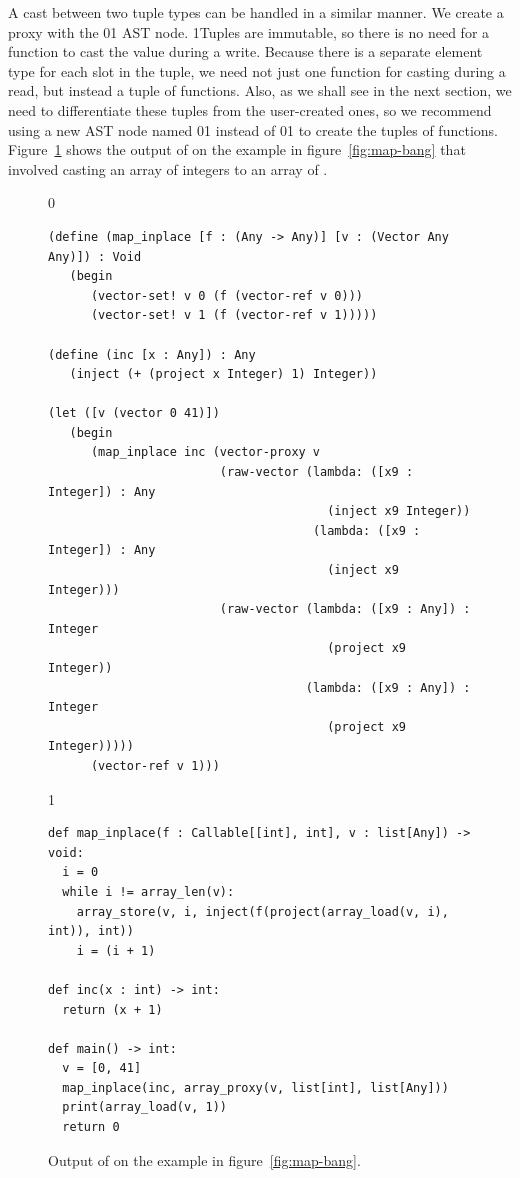 \documentclass[7x10]{TimesAPriori_MIT}%
\def\racketEd{0}
\def\pythonEd{1}
\def\edition{0}
\newcommand{\racket}[1]{{\if\edition\racketEd{#1}\fi}}
\newcommand{\python}[1]{{\if\edition\pythonEd #1\fi}}
\numberwithin{theorem}{chapter}
\numberwithin{definition}{chapter}
\numberwithin{equation}{chapter}
\begin{document}
A cast between two tuple types can be handled in a similar manner.
We create a proxy with the 
\racket{}\python{} AST node.
\python{Tuples are immutable, so there is no
  need for a function to cast the value during a write.}
Because there is a separate element type for each slot in the tuple,
we need not just one function for casting during a read, but instead a tuple
of functions.
%
Also, as we shall see in the next section, we need to differentiate
these tuples from the user-created ones, so we recommend using a new
AST node named \racket{}\python{}
instead of \racket{}\python{} to create the
tuples of functions.
%
Figure~\ref{fig:map-bang-lower-cast} shows the output of
 on the example in figure~\ref{fig:map-bang} that
involved casting an array of integers to an array of \CANYTY{}.

\begin{figure}[tbp]
\begin{tcolorbox}[colback=white]  
{\if\edition\racketEd    
\begin{lstlisting}
(define (map_inplace [f : (Any -> Any)] [v : (Vector Any Any)]) : Void
   (begin 
      (vector-set! v 0 (f (vector-ref v 0)))
      (vector-set! v 1 (f (vector-ref v 1)))))
  
(define (inc [x : Any]) : Any
   (inject (+ (project x Integer) 1) Integer))

(let ([v (vector 0 41)])
   (begin 
      (map_inplace inc (vector-proxy v
                        (raw-vector (lambda: ([x9 : Integer]) : Any
                                       (inject x9 Integer))
                                     (lambda: ([x9 : Integer]) : Any
                                       (inject x9 Integer)))
                        (raw-vector (lambda: ([x9 : Any]) : Integer
                                       (project x9 Integer))
                                    (lambda: ([x9 : Any]) : Integer
                                       (project x9 Integer)))))
      (vector-ref v 1)))
\end{lstlisting}
\fi}
{\if\edition\pythonEd
\begin{lstlisting}[basicstyle=\ttfamily\footnotesize]
def map_inplace(f : Callable[[int], int], v : list[Any]) -> void:
  i = 0
  while i != array_len(v):
    array_store(v, i, inject(f(project(array_load(v, i), int)), int))
    i = (i + 1)

def inc(x : int) -> int:
  return (x + 1)

def main() -> int:
  v = [0, 41]
  map_inplace(inc, array_proxy(v, list[int], list[Any]))
  print(array_load(v, 1))
  return 0
\end{lstlisting}
\fi}
\end{tcolorbox}

\caption{Output of  on the example in
  figure~\ref{fig:map-bang}.}
\label{fig:map-bang-lower-cast}
\end{figure}
\end{document}
